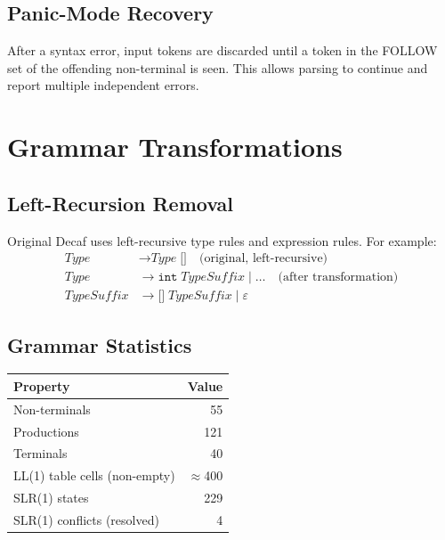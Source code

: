 \documentclass[12pt,a4paper]{article}
\begin{document}
\subsection{Panic-Mode Recovery}

After a syntax error, input tokens are discarded until a token in the FOLLOW set
of the offending non-terminal is seen. This allows parsing to continue and report
multiple independent errors.

\section{Grammar Transformations}

\subsection{Left-Recursion Removal}

Original Decaf uses left-recursive type rules and expression rules. For example:
\begin{align*}
  \textit{Type} &\to \textit{Type}\;\texttt{[]}  \quad\text{(original, left-recursive)}\\
  \textit{Type} &\to \texttt{int}\;\textit{TypeSuffix}
    \mid \ldots\quad\text{(after transformation)}\\
  \textit{TypeSuffix} &\to \texttt{[]}\;\textit{TypeSuffix} \mid \varepsilon
\end{align*}

\subsection{Grammar Statistics}

\begin{center}
\begin{tabular}{lr}
\toprule
Property & Value \\
\midrule
Non-terminals           & 55 \\
Productions             & 121 \\
Terminals               & 40 \\
LL(1) table cells (non-empty) & $\approx$400 \\
SLR(1) states           & 229 \\
SLR(1) conflicts (resolved) & 4 \\
\bottomrule
\end{tabular}
\end{center}
\end{document}
